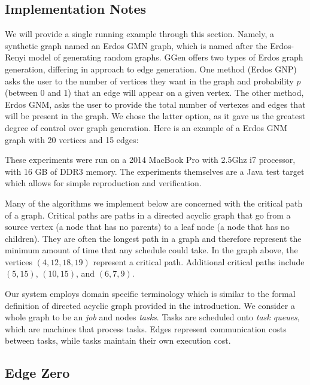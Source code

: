 \documentclass[11pt, oneside]{article}   	%
\begin{document}
\subsection{Implementation Notes}

We will provide a single running example through this section. Namely, a synthetic graph named an Erdos GMN graph, which is named after the Erdos-Renyi model of generating random graphs. GGen offers two types of Erdos graph generation, differing in approach to edge generation. One method (Erdos GNP) asks the user to the number of vertices they want in the graph and probability $p$ (between 0 and 1) that an edge will appear on a given vertex. The other method, Erdos GNM, asks the user to provide the total number of vertexes and edges that will be present in the graph. We chose the latter option, as it gave us the greatest degree of control over graph generation. Here is an example of a Erdos GNM graph with 20 vertices and 15 edges:


These experiments were run on a 2014 MacBook Pro with 2.5Ghz i7 processor, with 16 GB of DDR3 memory. The experiments themselves are a Java test target which allows for simple reproduction and verification.

Many of the algorithms we implement below are concerned with the critical path of a graph. Critical paths are paths in a directed acyclic graph that go from a source vertex (a node that has no parents) to a leaf node (a node that has no children). They are often the longest path in a graph and therefore represent the minimum amount of time that any schedule could take. In the graph above, the vertices $(4, 12, 18, 19)$ represent a critical path. Additional critical paths include $(5, 15)$, $(10, 15)$, and $(6, 7, 9)$.

Our system employs domain specific terminology which is similar to the formal definition of directed acyclic graph provided in the introduction. We consider a whole graph to be an \emph{job} and nodes \emph{tasks}. Tasks are scheduled onto \emph{task queues}, which are machines that process tasks. Edges represent communication costs between tasks, while tasks maintain their own execution cost.

\subsection{Edge Zero}
\end{document}
